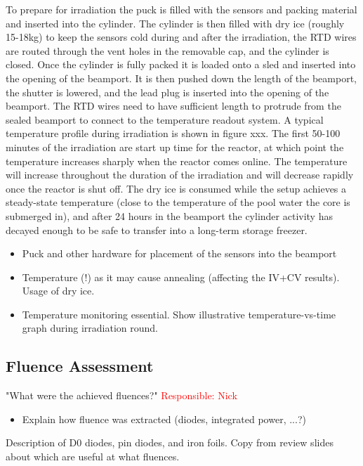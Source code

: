 To prepare for irradiation the puck is filled with the sensors and packing material and inserted into the cylinder. 
The cylinder is then filled with dry ice (roughly 15-18kg) to keep the sensors cold during and after the irradiation, the RTD wires are routed through the vent holes in the removable cap, and the cylinder is closed. 
Once the cylinder is fully packed it is loaded onto a sled and inserted into the opening of the beamport.
It is then pushed down the length of the beamport, the shutter is lowered, and the lead plug is inserted into the opening of the beamport.
The RTD wires need to have sufficient length to protrude from the sealed beamport to connect to the temperature readout system. 
A typical temperature profile during irradiation is shown in figure xxx.
The first 50-100 minutes of the irradiation are start up time for the reactor, at which point the temperature increases sharply when the reactor comes online.
The temperature will increase throughout the duration of the irradiation and will decrease rapidly once the reactor is shut off. 
The dry ice is consumed while the setup achieves a steady-state temperature (close to the temperature of the pool water the core is submerged in), and after 24 hours in the beamport the cylinder activity has decayed enough to be safe to transfer into a long-term storage freezer.


\begin{itemize}
  \item Puck and other hardware for placement of the sensors into the beamport
  \item Temperature (!) as it may cause annealing (affecting the IV+CV results). Usage of dry ice.
  \item Temperature monitoring essential. Show illustrative temperature-vs-time graph during irradiation round. 
\end{itemize}

\subsection{Fluence Assessment}
"What were the achieved fluences?" \textcolor{red}{Responsible: Nick}
\label{subsec:fluence_assessment}
\begin{itemize}
  \item Explain how fluence was extracted (diodes, integrated power, ...?)
\end{itemize}

Description of D0 diodes, pin diodes, and iron foils. 
Copy from review slides about which are useful at what fluences. 


